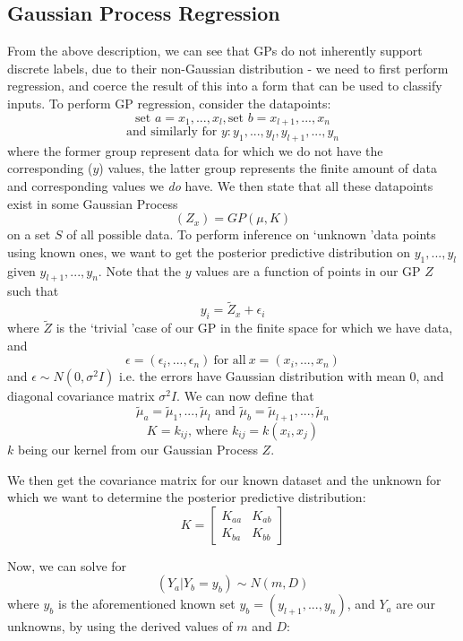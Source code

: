 \documentclass[10pt,sts]{article}
\begin{document}
\begin{multicols}{2}
    \subsection{Gaussian Process Regression} From the above description, we can see that GPs do not inherently support discrete labels, due to their non-Gaussian distribution - we need to first perform regression, and coerce the result of this into a form that can be used to classify inputs. To perform GP regression, consider the datapoints:
    $$ \textrm{set } a = x_1, ... , x_l, \textrm{set } b = x_{l+1}, ... , x_n $$
    $$ \textrm{and similarly for } y: y_1, ... , y_l, y_{l+1}, ... , y_n $$
    where the former group represent data for which we do not have the corresponding ($y$) values, the latter group represents the finite amount of data and corresponding values we \textit{do} have. We then state that all these datapoints exist in some Gaussian Process $$ (Z_x) = GP(\mu, K) $$ on a set $S$ of all possible data. To perform inference on \lq unknown \rq data points using known ones, we want to get the posterior predictive distribution on $y_1, ... , y_l$ given $y_{l+1}, ... , y_n$. Note that the $y$ values are a function of points in our GP $Z$ such that $$y_i = \widetilde{Z}_x + \epsilon_i$$ where $\widetilde{Z}$ is the \lq trivial \rq case of our GP in the finite space for which we have data, and $$\epsilon = (\epsilon_i, ... , \epsilon_n) \ \textrm{for all} \ x = (x_i, ... , x_n)$$ and $\epsilon \sim N(0, \sigma^2I)$ i.e. the errors have Gaussian distribution with mean 0, and diagonal covariance matrix $\sigma^2I$. We can now define that $$\widetilde{\mu}_{a} = \widetilde{\mu}_{1} ,..., \widetilde{\mu}_{l} \textrm{ and } \widetilde{\mu}_{b} = \widetilde{\mu}_{l+1} ,..., \widetilde{\mu}_{n}$$ 
    $$ K = k_{ij} \textrm{, where } k_{ij} = k(x_i, x_j) $$
    $k$ being our kernel from our Gaussian Process $Z$. 

    We then get the covariance matrix for our known dataset and the unknown for which we want to determine the posterior predictive distribution:
    $$ K = 
    \begin{bmatrix}
        K_{aa} & K_{ab} \\
        K_{ba} & K_{bb} 
    \end{bmatrix}
    $$

    Now, we can solve for $$(Y_a | Y_b = y_b) \sim N(m, D)$$
    where $y_b$ is the aforementioned known set $y_b = (y_{l+1}, ... , y_{n})$, and $Y_a$ are our unknowns, by using the derived values of $m$ and $D$:


\end{multicols}
\end{document}
